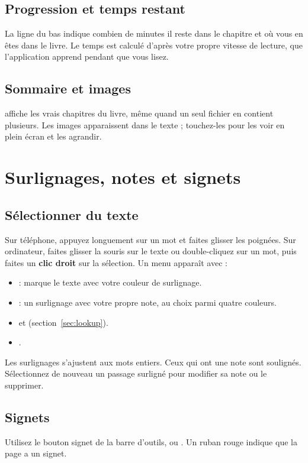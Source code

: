 \documentclass[11pt]{article}
\begin{document}
\subsection{Progression et temps restant}
La ligne du bas indique combien de minutes il reste dans le chapitre et où vous en êtes dans le
livre. Le temps est calculé d’après votre propre vitesse de lecture, que l’application apprend
pendant que vous lisez.

\subsection{Sommaire et images}
 affiche les vrais chapitres du livre, même quand un seul fichier en contient
plusieurs. Les images apparaissent dans le texte ; touchez-les pour les voir en plein écran et les
agrandir.

\section{Surlignages, notes et signets}

\subsection{Sélectionner du texte}
Sur téléphone, appuyez longuement sur un mot et faites glisser les poignées. Sur ordinateur,
faites glisser la souris sur le texte ou double-cliquez sur un mot, puis faites un
\textbf{clic droit} sur la sélection. Un menu apparaît avec :
\begin{itemize}
  \item {} : marque le texte avec votre couleur de surlignage.
  \item {} : un surlignage avec votre propre note, au choix parmi quatre couleurs.
  \item {} et  (section~\ref{sec:lookup}).
  \item {}.
\end{itemize}
Les surlignages s’ajustent aux mots entiers. Ceux qui ont une note sont soulignés. Sélectionnez de
nouveau un passage surligné pour modifier sa note ou le supprimer.

\subsection{Signets}
Utilisez le bouton signet de la barre d’outils, ou . Un ruban rouge indique que la
page a un signet.
\end{document}
